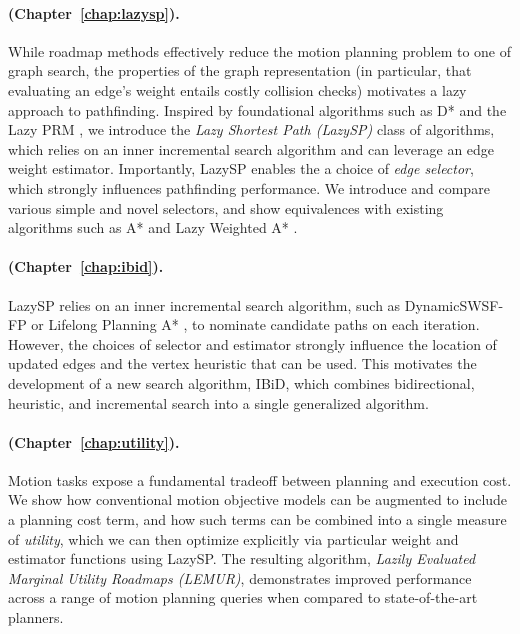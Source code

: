 \paragraph{ (Chapter~\ref{chap:lazysp}).}
While roadmap methods effectively reduce the motion planning problem
to one of graph search,
the properties of the graph representation
(in particular, that evaluating an edge's weight entails costly
collision checks)
motivates a lazy approach to pathfinding.
Inspired by foundational algorithms
such as D* \citep{stentz1994dstar}
and the Lazy PRM \citep{bohlin2000lazyprm},
we introduce the \emph{Lazy Shortest Path (LazySP)} class of algorithms,
which relies on an inner incremental search algorithm
and can leverage an edge weight estimator. 
Importantly,
LazySP enables the a choice of \emph{edge selector},
which strongly influences pathfinding performance.
We introduce and compare various simple and novel selectors,
and show equivalences with existing algorithms
such as A* \citep{hart1968astar}
and Lazy Weighted A* \citep{cohen2014narms}.

\paragraph{ (Chapter~\ref{chap:ibid}).}
LazySP relies on an inner incremental search algorithm,
such as DynamicSWSF-FP \citep{ramalingam1996dynamicswsffp}
or Lifelong Planning A* \citep{koenig2004lpastar},
to nominate candidate paths on each iteration.
However,
the choices of selector and estimator strongly influence
the location of updated edges
and the vertex heuristic that can be used.
This motivates the development of a new search algorithm,
IBiD,
which combines bidirectional, heuristic, and incremental search
into a single generalized algorithm.

\paragraph{ (Chapter~\ref{chap:utility}).}
Motion tasks expose a fundamental tradeoff between planning and
execution cost.
We show how conventional motion objective models
can be augmented to include a planning cost term,
and how such terms can be combined into a single measure of
\emph{utility},
which we can then optimize explicitly
via particular weight and estimator functions using LazySP.
The resulting algorithm,
\emph{Lazily Evaluated Marginal Utility Roadmaps (LEMUR)},
demonstrates improved performance across a range of motion planning
queries
when compared to state-of-the-art planners.


